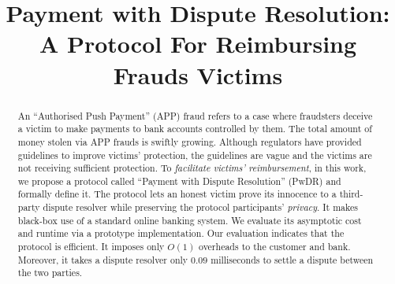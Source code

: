 \documentclass[sigconf,anonymous]{acmart}
\theoremstyle{remark}
\begin{document}
\newtheorem{claim}{Claim}[theorem]
\title{Payment with Dispute Resolution: \\ A Protocol For Reimbursing Frauds Victims}








\begin{abstract}
An ``Authorised Push Payment'' (APP) fraud refers to a case where fraudsters deceive a victim to make payments to bank accounts controlled by them.  The total amount of money stolen via APP frauds is swiftly growing. Although regulators have provided guidelines to improve victims’ protection, the guidelines are vague and the victims are not receiving sufficient protection. To  \emph{facilitate victims' reimbursement}, in this work, we propose a protocol called  ``Payment with Dispute Resolution'' (PwDR) and formally define it. The protocol lets an honest victim prove its innocence to a third-party dispute resolver while preserving the protocol participants' \emph{privacy}. It makes black-box use of a standard online banking system. We evaluate its asymptotic cost and runtime via a prototype implementation. Our evaluation indicates that the protocol is efficient. It imposes only $O(1)$ overheads to the customer and bank.  Moreover, it takes a dispute resolver only $0.09$ milliseconds to settle a dispute between the two parties.
\end{abstract}
\end{document}
